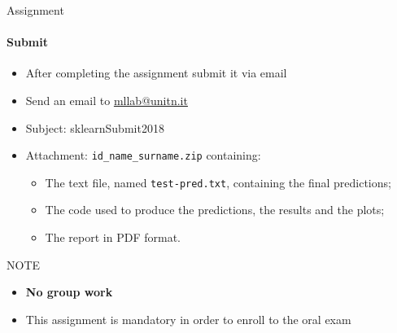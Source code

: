 \documentclass{beamer}
\begin{document}
\begin{frame}{Assignment}
\framesubtitle{Submit}

\begin{itemize}
    \item After completing the assignment submit it via email
    \item Send an email to \href{mailto:mllab@unitn.it}{mllab@unitn.it} 
    \item Subject: sklearnSubmit2018
    \item Attachment: \texttt{id\_name\_surname.zip} containing:
    \begin{itemize}
	    \item The text file, named \texttt{test-pred.txt},  containing the final predictions;
        \item The code used to produce the predictions, the results and the plots;
        \item The report in PDF format.
    \end{itemize}
\end{itemize}
\begin{alertblock}{NOTE}
    \begin{itemize}
	\item \textbf{No group work}
        \item This assignment is mandatory in order to enroll to the oral exam
    \end{itemize}
\end{alertblock}

\end{frame}
\end{document}
